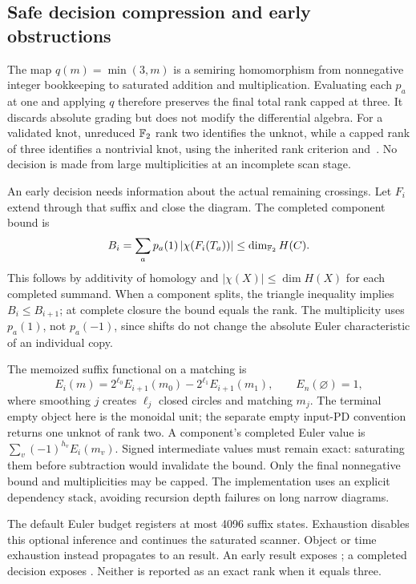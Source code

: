 \subsection{Safe decision compression and early obstructions}
The map $q(m)=\min(3,m)$ is a semiring homomorphism from nonnegative integer
bookkeeping to saturated addition and multiplication. Evaluating each
$p_a$ at one and applying $q$ therefore preserves the final total rank
capped at three. It discards absolute grading but does not modify the
differential algebra. For a validated knot, unreduced $\mathbb{F}_2$ rank two
identifies the unknot, while a capped rank of three identifies a nontrivial
knot, using the inherited rank criterion and~\cite{km}. No decision is
made from large multiplicities at an incomplete scan stage.

An early decision needs information about the actual remaining crossings.
Let $F_i$ extend through that suffix and close the diagram. The completed
component bound is
\[
 B_i=\sum_a p_a(1)\,|\chi(F_i(T_a))|\le\dim_{\mathbb{F}_2}H(C).
\]
This follows by additivity of homology and $|\chi(X)|\le\dim H(X)$ for
each completed summand. When a component splits, the triangle inequality
implies $B_i\le B_{i+1}$; at complete closure the bound equals the rank.
The multiplicity uses $p_a(1)$, not $p_a(-1)$, since shifts do not change
the absolute Euler characteristic of an individual copy.

The memoized suffix functional on a matching is
\[
 E_i(m)=2^{\ell_0}E_{i+1}(m_0)-2^{\ell_1}E_{i+1}(m_1),
 \qquad E_n(\varnothing)=1,
\]
where smoothing $j$ creates $\ell_j$ closed circles and matching $m_j$.
The terminal empty object here is the monoidal unit; the separate empty
input-PD convention returns one unknot of rank two. A component's completed
Euler value is $\sum_v(-1)^{h_v}E_i(m_v)$. Signed intermediate values must
remain exact: saturating them before subtraction would invalidate the
bound. Only the final nonnegative bound and multiplicities may be capped.
The implementation uses an explicit dependency stack, avoiding recursion
depth failures on long narrow diagrams.

The default Euler budget registers at most 4096 suffix states. Exhaustion
disables this optional inference and continues the saturated scanner.
Object or time exhaustion instead propagates to an  result.
An early result exposes ; a completed
decision exposes . Neither is reported as an exact rank
when it equals three.

